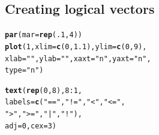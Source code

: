\documentclass{tufte-book}\usepackage[]{graphicx}\usepackage[]{color}
\makeatletter
\newcommand{\hlnum}[1]{\textcolor[rgb]{0.686,0.059,0.569}{#1}}%
\newcommand{\hlstr}[1]{\textcolor[rgb]{0.192,0.494,0.8}{#1}}%
\newcommand{\hlopt}[1]{\textcolor[rgb]{0,0,0}{#1}}%
\newcommand{\hlstd}[1]{\textcolor[rgb]{0.345,0.345,0.345}{#1}}%
\newcommand{\hlkwc}[1]{\textcolor[rgb]{0.333,0.667,0.333}{#1}}%
\newcommand{\hlkwd}[1]{\textcolor[rgb]{0.737,0.353,0.396}{\textbf{#1}}}%
\newenvironment{kframe}{%
 \def\at@end@of@kframe{}%
 \ifinner\ifhmode%
  \def\at@end@of@kframe{\end{minipage}}%
  \begin{minipage}{\columnwidth}%
 \fi\fi%
 \def\FrameCommand##1{\hskip\@totalleftmargin \hskip-\fboxsep
 \colorbox{shadecolor}{##1}\hskip-\fboxsep
     \hskip-\linewidth \hskip-\@totalleftmargin \hskip\columnwidth}%
 \MakeFramed {\advance\hsize-\width
   \@totalleftmargin\z@ \linewidth\hsize
   \@setminipage}}%
 {\par\unskip\endMakeFramed%
 \at@end@of@kframe}
\newenvironment{knitrout}{}{} %
\makeatother
\begin{document}
\begin{footnotesize}
\section{Creating logical vectors}


\begin{marginfigure}
\begin{tiny}
\begin{knitrout}
\color{fgcolor}\begin{kframe}
\begin{alltt}
\hlkwd{par}\hlstd{(}\hlkwc{mar} \hlstd{=} \hlkwd{rep}\hlstd{(}\hlnum{.1}\hlstd{,} \hlnum{4}\hlstd{))}
\hlkwd{plot}\hlstd{(}\hlnum{1}\hlstd{,} \hlkwc{xlim} \hlstd{=} \hlkwd{c}\hlstd{(}\hlnum{0}\hlstd{,} \hlnum{1.1}\hlstd{),} \hlkwc{ylim} \hlstd{=} \hlkwd{c}\hlstd{(}\hlnum{0}\hlstd{,} \hlnum{9}\hlstd{),}
     \hlkwc{xlab} \hlstd{=} \hlstr{""}\hlstd{,} \hlkwc{ylab} \hlstd{=} \hlstr{""}\hlstd{,} \hlkwc{xaxt} \hlstd{=} \hlstr{"n"}\hlstd{,} \hlkwc{yaxt} \hlstd{=} \hlstr{"n"}\hlstd{,}
     \hlkwc{type} \hlstd{=} \hlstr{"n"}\hlstd{)}


\hlkwd{text}\hlstd{(}\hlkwd{rep}\hlstd{(}\hlnum{0}\hlstd{,} \hlnum{8}\hlstd{),} \hlnum{8}\hlopt{:}\hlnum{1}\hlstd{,}
     \hlkwc{labels} \hlstd{=} \hlkwd{c}\hlstd{(}\hlstr{"=="}\hlstd{,} \hlstr{"!="}\hlstd{,} \hlstr{"<"}\hlstd{,} \hlstr{"<="}\hlstd{,}
                \hlstr{">"}\hlstd{,} \hlstr{">="}\hlstd{,} \hlstr{"|"}\hlstd{,} \hlstr{"!"}\hlstd{),}
     \hlkwc{adj} \hlstd{=} \hlnum{0}\hlstd{,} \hlkwc{cex} \hlstd{=} \hlnum{3}\hlstd{)}


\end{alltt}
\end{kframe}
\end{knitrout}
\end{tiny}
\end{marginfigure}
\end{footnotesize}
\end{document}
